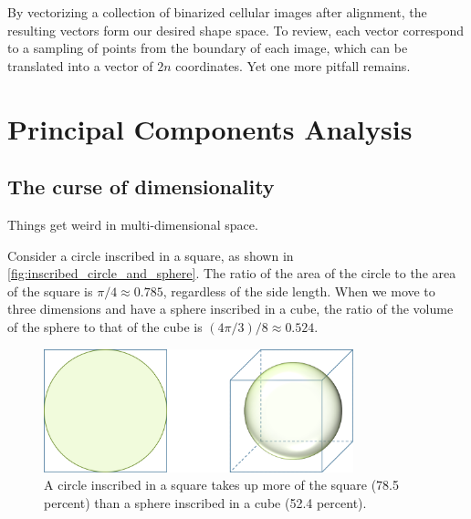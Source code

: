 \begin{note}\end{note}

By vectorizing a collection of binarized cellular images after alignment, the resulting vectors form our desired shape space. To review, each vector correspond to a sampling of  points from the boundary of each image, which can be translated into a vector of $2n$ coordinates. Yet one more pitfall remains.\\


\FloatBarrier
{}

\section{Principal Components Analysis}
\label{sec:pca}

\subsection{The curse of dimensionality}

Things get weird in multi-dimensional space.

Consider a circle inscribed in a square, as shown in \autoref{fig:inscribed_circle_and_sphere}. The ratio of the area of the circle to the area of the square is $π/4 \approx 0.785$, regardless of the side length. When we move to three dimensions and have a sphere inscribed in a cube, the ratio of the volume of the sphere to that of the cube is $(4π/3)/8 \approx 0.524$.\\

\begin{figure}[h]
\centering
\mySfFamily
\includegraphics[width = 0.8\textwidth]{../images/inscribed_circle_and_sphere.png}
\caption{A circle inscribed in a square takes up more of the square (78.5 percent) than a sphere inscribed in a cube (52.4 percent).}
\label{fig:inscribed_circle_and_sphere}
\end{figure}


